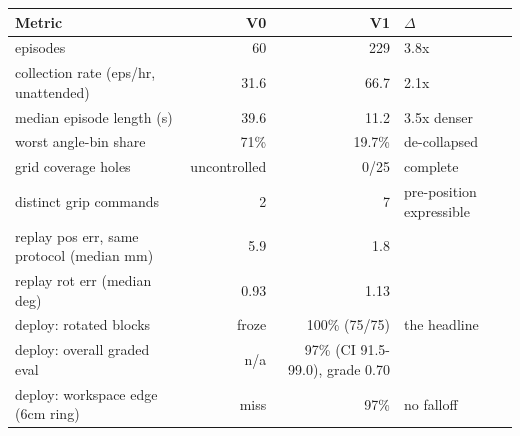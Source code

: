 \begin{tabular}{lrrl}
\toprule
Metric & V0 & V1 & $\Delta$ \\
\midrule
episodes & 60 & 229 & 3.8x \\
collection rate (eps/hr, unattended) & 31.6 & 66.7 & 2.1x \\
median episode length (s) & 39.6 & 11.2 & 3.5x denser \\
worst angle-bin share & 71\% & 19.7\% & de-collapsed \\
grid coverage holes & uncontrolled & 0/25 & complete \\
distinct grip commands & 2 & 7 & pre-position expressible \\
replay pos err, same protocol (median mm) & 5.9 & 1.8 &  \\
replay rot err (median deg) & 0.93 & 1.13 &  \\
deploy: rotated blocks & froze & 100\% (75/75) & the headline \\
deploy: overall graded eval & n/a & 97\% (CI 91.5-99.0), grade 0.70 &  \\
deploy: workspace edge (6cm ring) & miss & 97\% & no falloff \\
\bottomrule
\end{tabular}
